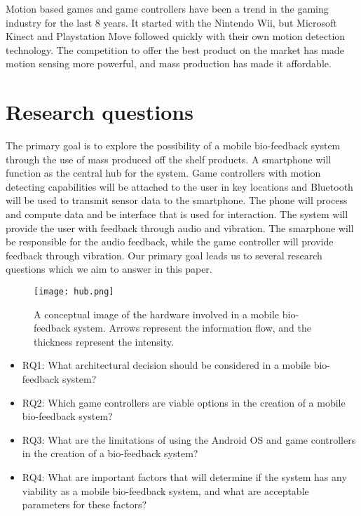 
Motion based games and game controllers have been a trend in the gaming industry for the last 8 years. It started with the Nintendo Wii, but Microsoft Kinect and Playstation Move followed quickly with their own motion detection technology. The competition to offer the best product on the market has made motion sensing more powerful, and mass production has made it affordable.

\section{Research questions}
The primary goal is to explore the possibility of a mobile bio-feedback system through the use of mass produced off the shelf products. A smartphone will function as the central hub for the system. Game controllers with motion detecting capabilities will be attached to the user in key locations and Bluetooth will be used to transmit sensor data to the smartphone. The phone will process and compute data and be interface that is used for interaction. The system will provide the user with feedback through audio and vibration. The smarphone will be responsible for the audio feedback, while the game controller will provide feedback through vibration. Our primary goal leads us to several research questions which we aim to answer in this paper.


\begin{figure}[h!]
  \centering
    \texttt{[image: hub.png]}
    \caption{\footnotesize A conceptual image of the hardware involved in a mobile bio-feedback system. Arrows represent the information flow, and the thickness represent the intensity.}
\end{figure}


\begin{itemize}

\item RQ1: What architectural decision should be considered in a mobile bio-feedback system?

\item RQ2: Which game controllers are viable options in the creation of a mobile bio-feedback system?

\item RQ3: What are the limitations of using the Android OS and game controllers in the creation of a bio-feedback system?

\item RQ4: What are important factors that will determine if the system has any viability as a mobile bio-feedback system, and what are acceptable parameters for these factors?

\end{itemize}

